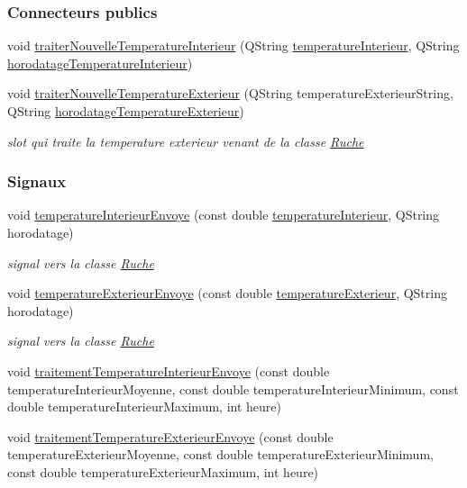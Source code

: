 \subsubsection*{Connecteurs publics}
\begin{DoxyCompactItemize}
\item 
void \hyperlink{class_infos_temperature_a547da18a7c04603d2f30eece061d9634}{traiter\+Nouvelle\+Temperature\+Interieur} (Q\+String \hyperlink{class_infos_temperature_a976ab7ead7ac82b5b8572807d778689e}{temperature\+Interieur}, Q\+String \hyperlink{class_infos_temperature_ad4c62d479b8897102a59025a56d7b4c6}{horodatage\+Temperature\+Interieur})
\item 
void \hyperlink{class_infos_temperature_ab8d95f48c31ca17c8690849562268420}{traiter\+Nouvelle\+Temperature\+Exterieur} (Q\+String temperature\+Exterieur\+String, Q\+String \hyperlink{class_infos_temperature_a5c3cd364746dc1cae5f9faee55c7555e}{horodatage\+Temperature\+Exterieur})
\begin{DoxyCompactList}\small\item\em slot qui traite la temperature exterieur venant de la classe \hyperlink{class_ruche}{Ruche} \end{DoxyCompactList}\end{DoxyCompactItemize}
\subsubsection*{Signaux}
\begin{DoxyCompactItemize}
\item 
void \hyperlink{class_infos_temperature_acaff5cc6bedc53a8bf2c914957d2ab47}{temperature\+Interieur\+Envoye} (const double \hyperlink{class_infos_temperature_a976ab7ead7ac82b5b8572807d778689e}{temperature\+Interieur}, Q\+String horodatage)
\begin{DoxyCompactList}\small\item\em signal vers la classe \hyperlink{class_ruche}{Ruche} \end{DoxyCompactList}\item 
void \hyperlink{class_infos_temperature_a6fbc9ab43714a5ba6649648c15989dee}{temperature\+Exterieur\+Envoye} (const double \hyperlink{class_infos_temperature_af80286a5b0e05d0379f53c0ebbc7d483}{temperature\+Exterieur}, Q\+String horodatage)
\begin{DoxyCompactList}\small\item\em signal vers la classe \hyperlink{class_ruche}{Ruche} \end{DoxyCompactList}\item 
void \hyperlink{class_infos_temperature_a2d7c580a215f918a79aac46a15ff24b9}{traitement\+Temperature\+Interieur\+Envoye} (const double temperature\+Interieur\+Moyenne, const double temperature\+Interieur\+Minimum, const double temperature\+Interieur\+Maximum, int heure)
\item 
void \hyperlink{class_infos_temperature_aaebee9d6151257fa1f182665d0fecf2c}{traitement\+Temperature\+Exterieur\+Envoye} (const double temperature\+Exterieur\+Moyenne, const double temperature\+Exterieur\+Minimum, const double temperature\+Exterieur\+Maximum, int heure)
\end{DoxyCompactItemize}
